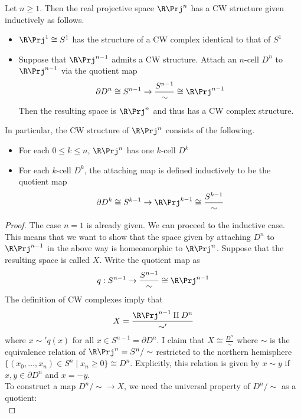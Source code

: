\documentclass[a4paper]{article}
\begin{document}
\begin{prp}{}{} Let $n\geq 1$. Then the real projective space $\R\Prj^n$ has a CW structure given inductively as follows. 
\begin{itemize}
\item $\R\Prj^1\cong S^1$ has the structure of a CW complex identical to that of $S^1$
\item Suppose that $\R\Prj^{n-1}$ admits a CW structure. Attach an $n$-cell $D^n$ to $\R\Prj^{n-1}$ via the quotient map $$\partial D^n\cong S^{n-1}\to\frac{S^{n-1}}{\sim}\cong\R\Prj^{n-1}$$ Then the resulting space is $\R\Prj^n$ and thus has a CW complex structure. 
\end{itemize}
In particular, the CW structure of $\R\Prj^n$ consists of the following. 
\begin{itemize}
\item For each $0\leq k\leq n$, $\R\Prj^n$ has one $k$-cell $D^k$
\item For each $k$-cell $D^k$, the attaching map is defined inductively to be the quotient map $$\partial D^k\cong S^{k-1}\to\R\Prj^{k-1}\cong\frac{S^{k-1}}{\sim}$$
\end{itemize} 
\begin{proof}
The case $n=1$ is already given. We can proceed to the inductive case. This means that we want to show that the space given by attaching $D^n$ to $\R\Prj^{n-1}$ in the above way is homeomorphic to $\R\Prj^n$. Suppose that the resulting space is called $X$. Write the quotient map as $$q:S^{n-1}\to\frac{S^{n-1}}{\sim}\cong\R\Prj^{n-1}$$ The definition of CW complexes imply that $$X=\frac{\R\Prj^{n-1}\amalg D^n}{\sim'}$$ where $x\sim' q(x)$ for all $x\in S^{n-1}=\partial D^n$. I claim that $X\cong\frac{D^n}{\sim}$ where $\sim$ is the equivalence relation of $\R\Prj^n=S^n/\sim$ restricted to the northern hemisphere $\{(x_0,\dots,x_n)\in S^n\;|\;x_n\geq 0\}\cong D^n$. Explicitly, this relation is given by $x\sim y$ if $x,y\in\partial D^n$ and $x=-y$. \\
To construct a map $D^n/\sim\to X$, we need the universal property of $D^n/\sim$ as a quotient: \\
\end{proof}
\end{prp}
\end{document}
